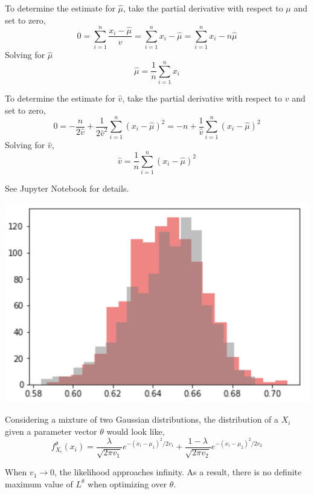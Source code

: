 \documentclass[12pt,twoside]{article}
\begin{document}
\begin{problems}
\begin{problemparts}
To determine the estimate for $\hat{\mu}$, take the partial derivative with
respect to $\mu$ and set to zero,
$$ 0 = \sum_{i = 1}^n \frac{x_i - \hat{\mu}}{v} = \sum_{i = 1}^n x_i - 
\hat{\mu} = \sum_{i = 1}^n x_i - n \hat{\mu} $$
Solving for $\hat{\mu}$
$$ \hat{\mu} = \frac{1}{n} \sum_{i = 1}^n x_i $$

To determine the estimate for $\hat{v}$, take the partial derivative with
respect to $v$ and set to zero,
$$ 0 = -\frac{n}{2\hat{v}} + \frac{1}{2 \hat{v}^2} \sum_{i = 1}^n (x_i - 
\hat{\mu})^2 = -n + \frac{1}{\hat{v}} \sum_{i = 1}^n (x_i - \hat{\mu})^2 $$
Solving for $\hat{v}$,
$$ \hat{v} = \frac{1}{n} \sum_{i = 1}^n (x_i - \hat{\mu})^2 $$

\problempart %

See Jupyter Notebook for details.

\begin{center}
    \includegraphics[scale=0.75]{PS1P3B.png}
\end{center}

\problempart %
Considering a mixture of two Gaussian distributions, the distribution of a $X_i$
given a parameter vector $\theta$ would look like,
$$ f_{X_i}^\theta(x_i) = \frac{\lambda}{\sqrt{2 \pi v_1}} e^{-(x_i - \mu_1)^2 
/ 2 v_1} + \frac{1 - \lambda}{\sqrt{2 \pi v_2}} e^{-(x_i - \mu_2)^2 / 2 v_2} $$

\problempart %

When $v_1 \longrightarrow 0$, the likelihood approaches infinity. As a result,
there is no definite maximum value of $L^\theta$ when optimizing over $\theta$.

\problempart %


\end{problemparts}
\end{problems}
\end{document}
